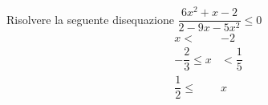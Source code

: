 Risolvere la seguente disequazione $\dfrac{6x^2+x-2}{2-9x-5x^2}\leq 0$
\begin{align*}
x<& -2\\ -\dfrac{2}{3}\leq x&< \dfrac{1}{5}\\ \dfrac{1}{2}\leq&x\\
\end{align*}
